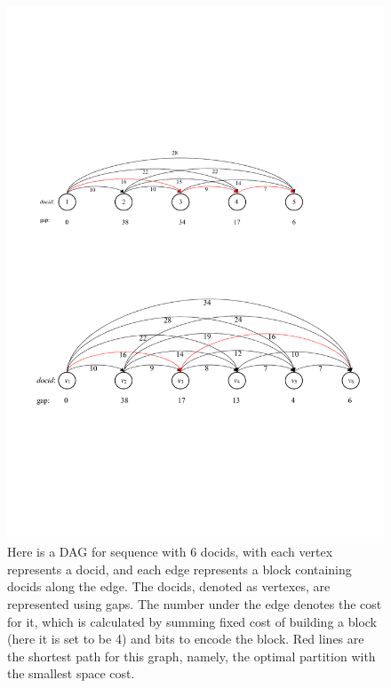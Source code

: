 \documentclass[runningheads,a4paper]{llncs}
\begin{document}
\begin{figure}
	\centering
	\includegraphics[width=1.0\linewidth]{sssp}
	\caption[sssp]{Here is a DAG for sequence with 6 docids, with each vertex represents a docid, and each edge represents a block containing docids along the edge. The docids, denoted as vertexes, are represented using gaps. The number under the edge denotes the cost for it, which is calculated by summing fixed cost of building a block (here it is set to be 4) and bits to encode the block. Red lines are the shortest path for this graph, namely, the optimal partition with the smallest space cost.}
	\label{fig:sssp}
\end{figure}
\end{document}
